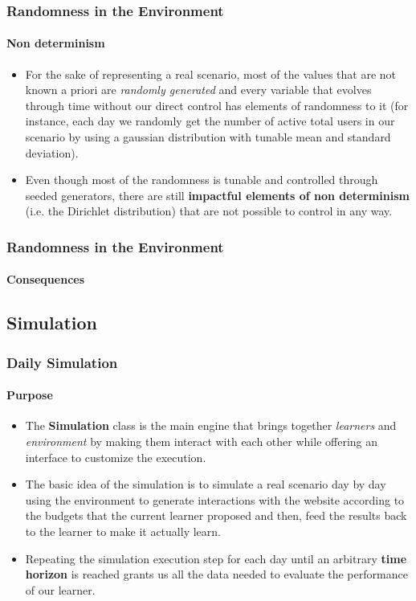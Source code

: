 \documentclass[11pt]{beamer}
\begin{document}
\begin{frame}

\frametitle{Randomness in the Environment}
\framesubtitle{Non determinism}

\begin{itemize}[leftmargin=*, label={$\circ$}]
    \item For the sake of representing a real scenario, most of the values that are not known a priori are \textit{randomly generated} and every variable that evolves through time without our direct control has elements of randomness to it (for instance, each day we randomly get the number of active total users in our scenario by using a gaussian distribution with tunable mean and standard deviation).
    \item Even though most of the randomness is tunable and controlled through seeded generators, there are still \textbf{impactful elements of non determinism} (i.e. the Dirichlet distribution) that are not possible to control in any way.
\end{itemize}

\end{frame}


\begin{frame}

\frametitle{Randomness in the Environment}
\framesubtitle{Consequences}


\end{frame}


\subsection{Simulation}


\begin{frame}

\frametitle{Daily Simulation}
\framesubtitle{Purpose}

\begin{itemize}[leftmargin=*, label={$\circ$}]
    \item The \textbf{Simulation} class is the main engine that brings together \textit{learners} and \textit{environment} by making them interact with each other while offering an interface to customize the execution.
    \item The basic idea of the simulation is to simulate a real scenario day by day using the environment to generate interactions with the website according to the budgets that the current learner proposed and then, feed the results back to the learner to make it actually learn.
    \item Repeating the simulation execution step for each day until an arbitrary \textbf{time horizon} is reached grants us all the data needed to evaluate the performance of our learner.
\end{itemize}

\end{frame}
\end{document}
